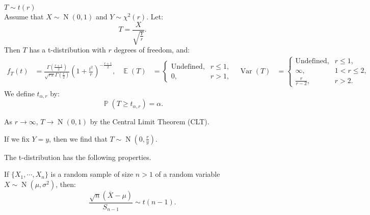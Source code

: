 \documentclass{huhtakm-template-book-v2}
\DeclareMathOperator{\prob}{\mathbb{P}}
\DeclareMathOperator{\E}{\mathbb{E}}
\DeclareMathOperator{\Var}{Var}
\DeclareMathOperator{\N}{N}
\begin{document}
    \begin{eg} $T \sim t(r)$\\
        Assume that $X \sim \N(0, 1)$ and $Y \sim \chi^{2}(r)$. Let:
        \begin{equation*}
            T = \frac{X}{\sqrt{\frac{Y}{r}}}.
        \end{equation*}
        Then $T$ has a t-distribution with $r$ degrees of freedom, and:
        \begin{align*}
            f_{T}(t) &= \frac{\Gamma\left(\frac{r + 1}{2}\right)}{\sqrt{r\pi} \Gamma\left(\frac{r}{2}\right)} \left(1 + \frac{t^{2}}{r}\right)^{-\frac{r + 1}{2}}, & \E(T) &= \begin{cases}
                \text{Undefined}, &r \leq 1,\\
                0, &r > 1,
            \end{cases} & \Var(T) &= \begin{cases}
                \text{Undefined}, &r \leq 1,\\
                \infty, &1 < r \leq 2,\\
                \frac{r}{r - 2}, &r > 2.
            \end{cases}
        \end{align*}
        We define $t_{\alpha, r}$ by:
        \begin{equation*}
            \prob(T \geq t_{\alpha, r}) = \alpha.
        \end{equation*}
    \end{eg}
    \begin{rem}
        As $r \to \infty$, $T \to \N(0, 1)$ by the Central Limit Theorem (CLT).
    \end{rem}
    \begin{rem}
        If we fix $Y = y$, then we find that $T \sim \N\left(0, \frac{r}{y}\right)$.
    \end{rem}
    The t-distribution has the following properties.
    \begin{thm}
        If $\{X_{1}, \cdots, X_{n}\}$ is a random sample of size $n > 1$ of a random variable $X \sim \N(\mu, \sigma^{2})$, then:
        \begin{equation*}
            \frac{\sqrt{n}(\overline{X} - \mu)}{S_{n-1}} \sim t(n - 1).
        \end{equation*}
    \end{thm}
\end{document}
